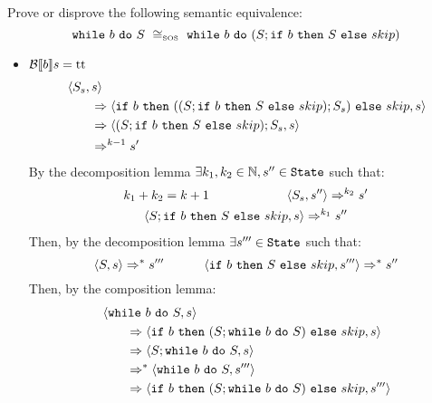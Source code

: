 \begin{exercise}{
    Prove or disprove the following semantic equivalence:
    \[ \wwhile{b}{S}\ \SOScong\ \wwhile{b}{(S;\wif{b}{S}{skip})} \]
}
\begin{itemize}
\begin{itemize}
\begin{itemize}
\begin{align*}
                                \\&\qquad\Rightarrow \instr{\wif{b}{(S; \wwhile{b}{S})}{skip}}{s}
                                \\&\qquad\Rightarrow \instr{skip}{s}
                                \\&\qquad\Rightarrow s
                            \end{align*}
                        \item $\mathcal{B} \llbracket b \rrbracket s = \text{tt}$
                            \begin{align*}
                                &\left<S_s, s\right>
                                \\&\qquad\Rightarrow \left<\texttt{if}\ b\ \texttt{then}\ ((S;\texttt{if}\ b\ \texttt{then}\ S\ \texttt{else}\ skip);S_s)\ \texttt{else}\ skip, s\right>
                                \\&\qquad\Rightarrow \left<(S;\texttt{if}\ b\ \texttt{then}\ S\ \texttt{else}\ skip);S_s, s\right>
                                \\&\qquad\Rightarrow^{k - 1} s'
                            \end{align*}
                            By the decomposition lemma $\exists k_1, k_2 \in \mathbb{N}, s'' \in \texttt{State}$ such that:
                            \begin{gather*}
                                k_1 + k_2 = k + 1 \qquad\qquad\qquad \left<S_s, s''\right> \Rightarrow^{k_2} s' \\
                                \left<S;\texttt{if}\ b\ \texttt{then}\ S\ \texttt{else}\ skip, s\right> \Rightarrow^{k_1} s''
                            \end{gather*}
                            Then, by the decomposition lemma $\exists s''' \in \texttt{State}$ such that:
                            \[
                                \left<S, s\right> \Rightarrow^* s'''
                                \qquad\quad
                                \left<\texttt{if}\ b\ \texttt{then}\ S\ \texttt{else}\ skip, s'''\right> \Rightarrow^* s''
                            \]
                            Then, by the composition lemma:
                            \begin{align*}
                                &\instr{\wwhile{b}{S}}{s}
                                \\&\qquad\Rightarrow \instr{\wif{b}{(S; \wwhile{b}{S})}{skip}}{s}
                                \\&\qquad\Rightarrow \instr{S; \wwhile{b}{S}}{s}
                                \\&\qquad\Rightarrow^* \instr{\wwhile{b}{S}}{s'''}
                                \\&\qquad\Rightarrow \instr{\wif{b}{(S; \wwhile{b}{S})}{skip}}{s'''}

\end{align*}
\end{itemize}
\end{itemize}
\end{itemize}
\end{exercise}
